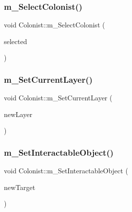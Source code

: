 \mbox{\label{class_colonist_abd0ac8d5315b88b193a0c288caa1e070}} 
\subsubsection{\texorpdfstring{m\+\_\+\+Select\+Colonist()}{m\_SelectColonist()}}
{\footnotesize\ttfamily void Colonist\+::m\+\_\+\+Select\+Colonist (\begin{DoxyParamCaption}\item[{bool}]{selected }\end{DoxyParamCaption})}

\mbox{\label{class_colonist_a5baacaaf37c94daeb2a1ab21c8d9e42a}} 
\subsubsection{\texorpdfstring{m\+\_\+\+Set\+Current\+Layer()}{m\_SetCurrentLayer()}}
{\footnotesize\ttfamily void Colonist\+::m\+\_\+\+Set\+Current\+Layer (\begin{DoxyParamCaption}\item[{unsigned int}]{new\+Layer }\end{DoxyParamCaption})}

\mbox{\label{class_colonist_a424fe6f992957fe97b1cc7008dfd9233}} 
\subsubsection{\texorpdfstring{m\+\_\+\+Set\+Interactable\+Object()}{m\_SetInteractableObject()}}
{\footnotesize\ttfamily void Colonist\+::m\+\_\+\+Set\+Interactable\+Object (\begin{DoxyParamCaption}\item[{\mbox{\hyperlink{class_building_object}{Building\+Object}} $\ast$}]{new\+Target }\end{DoxyParamCaption})}

